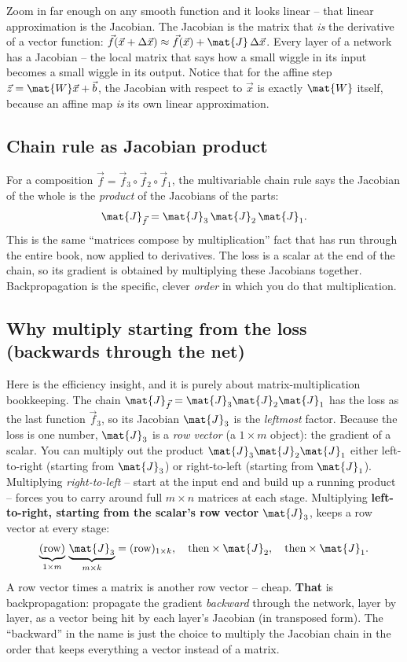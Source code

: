 \begin{intuitionbox}
Zoom in far enough on any smooth function and it looks linear -- that linear approximation
is the Jacobian. The Jacobian is the matrix that \emph{is} the derivative of a vector
function: $\vec{f}(\vec{x}+\Delta\vec{x}) \approx \vec{f}(\vec{x}) + \mat{J}\,\Delta\vec{x}$.
Every layer of a network has a Jacobian -- the local matrix that says how a small wiggle
in its input becomes a small wiggle in its output. Notice that for the affine step
$\vec{z}=\mat{W}\vec{x}+\vec{b}$, the Jacobian with respect to $\vec{x}$ is exactly
$\mat{W}$ itself, because an affine map \emph{is} its own linear approximation.
\end{intuitionbox}

\subsection{Chain rule as Jacobian product}

For a composition $\vec{f} = \vec{f}_3 \circ \vec{f}_2 \circ \vec{f}_1$, the multivariable
chain rule says the Jacobian of the whole is the \emph{product} of the Jacobians of the
parts:
\[
\mat{J}_{\vec{f}} = \mat{J}_{3}\,\mat{J}_{2}\,\mat{J}_{1}.
\]
This is the same ``matrices compose by multiplication'' fact that has run through the
entire book, now applied to derivatives. The loss is a scalar at the end of the chain, so
its gradient is obtained by multiplying these Jacobians together. Backpropagation is the
specific, clever \emph{order} in which you do that multiplication.

\subsection{Why multiply starting from the loss (backwards through the net)}

Here is the efficiency insight, and it is purely about matrix-multiplication bookkeeping.
The chain $\mat{J}_{\vec{f}} = \mat{J}_3\mat{J}_2\mat{J}_1$ has the loss as the last
function $\vec{f}_3$, so its Jacobian $\mat{J}_3$ is the \emph{leftmost} factor. Because
the loss is one number, $\mat{J}_3$ is a \emph{row vector} (a $1\times m$ object): the
gradient of a scalar. You can multiply out the product $\mat{J}_3\mat{J}_2\mat{J}_1$
either left-to-right (starting from $\mat{J}_3$) or right-to-left (starting from
$\mat{J}_1$). Multiplying \emph{right-to-left} -- start at the input end and build up a
running product -- forces you to carry around full $m\times n$ matrices at each stage.
Multiplying \textbf{left-to-right, starting from the scalar's row vector} $\mat{J}_3$,
keeps a row vector at every stage:
\[
\underbrace{(\text{row})}_{1\times m}\,\underbrace{\mat{J}_3}_{m\times k}
= (\text{row})_{1\times k}, \quad \text{then} \times \mat{J}_2, \quad \text{then} \times \mat{J}_1.
\]
A row vector times a matrix is another row vector -- cheap. \textbf{That} is
backpropagation: propagate the gradient \emph{backward} through the network, layer by
layer, as a vector being hit by each layer's Jacobian (in transposed form). The
``backward'' in the name is just the choice to multiply the Jacobian chain in the order
that keeps everything a vector instead of a matrix.

